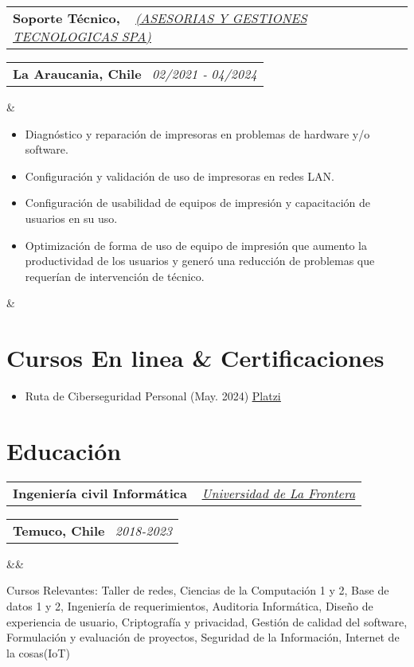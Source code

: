\documentclass[11pt,a4paper,sans]{moderncv}
\makeatletter
\newcommand*{\customcventry}[7][.13em]{
    \begin{tabular}{@{}l}
    {\bfseries #4} \
    {\itshape #3}
    \end{tabular}
    \hfill
    \begin{tabular}{l@{}}
    {\bfseries #5} \
    {\itshape #2}
    \end{tabular}
    \ifx&#7&%
    \else{\
    \begin{minipage}{\maincolumnwidth}%
    \small#7%
    \end{minipage}}\fi%
    \par\addvspace{#1}
}
\makeatother
\begin{document}
\customcventry
    {02/2021 ‐ 04/2024}
    {{ \color{blue} \href{http://www.tisol.cl/}{(ASESORIAS Y GESTIONES TECNOLOGICAS SPA)} }}
    {Soporte Técnico,}
    {La Araucania, Chile}
    {}
    {{\begin{itemize}[leftmargin=0.6cm, label={\textbullet}]
        \item Diagnóstico y reparación de impresoras en problemas de hardware y/o software.
        \item Configuración y validación de uso de impresoras en redes LAN.
        \item Configuración de usabilidad de equipos de impresión y capacitación de usuarios en su uso.
        \item Optimización de forma de uso de equipo de impresión que aumento la productividad de los usuarios y generó una reducción de problemas que requerían de intervención de técnico.
    \end{itemize}
    }
}

\section{Cursos En linea \& Certificaciones}{
    \begin{itemize}[label=\textbullet]
        \item Ruta de Ciberseguridad Personal (May. 2024) \underline{\color{blue}\href{https://1drv.ms/b/c/13c8ae619d64655e/EZYaMe6SBhJAshtvq4ORCQoBwWMYRerI4_xiuqXjORVd0w?e=I4tLqg}{Platzi}}
    \end{itemize}
} 

\section{Educación}
\customcventry
    {2018-2023}
    { \color{blue} \href{https://www.ufro.cl/}{Universidad de La Frontera} }{Ingeniería civil Informática}{Temuco, Chile}
    {}{}
    {Cursos Relevantes: 
        Taller de redes, 
        Ciencias de la Computación 1 y 2, 
        Base de datos 1 y 2, 
        Ingeniería de requerimientos,
        Auditoria Informática, 
        Diseño de experiencia de usuario, 
        Criptografía y privacidad, 
        Gestión de calidad del software, 
        Formulación y evaluación de proyectos,
        Seguridad de la Información,
        Internet de la cosas(IoT)
}
    
\end{document}
